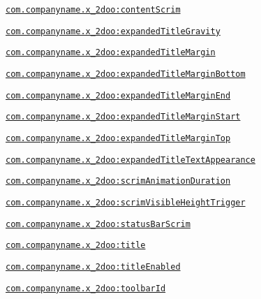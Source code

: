 {\tt \hyperlink{classandroid_1_1support_1_1v4_1_1_r_1_1styleable_060f29f1813e3c34f37be84c9cad4fcd}{com.companyname.x\_\-2doo:contentScrim}}

{\tt \hyperlink{classandroid_1_1support_1_1v4_1_1_r_1_1styleable_93665cc12bb385c8014cbdcaa5d898a6}{com.companyname.x\_\-2doo:expandedTitleGravity}}

{\tt \hyperlink{classandroid_1_1support_1_1v4_1_1_r_1_1styleable_d2288d088bf1c64e433d0cbecf59b50e}{com.companyname.x\_\-2doo:expandedTitleMargin}}

{\tt \hyperlink{classandroid_1_1support_1_1v4_1_1_r_1_1styleable_3c19128c4f13cc0876d4f6a58f4e2d88}{com.companyname.x\_\-2doo:expandedTitleMarginBottom}}

{\tt \hyperlink{classandroid_1_1support_1_1v4_1_1_r_1_1styleable_51a799757acf71b646e197b66d32c630}{com.companyname.x\_\-2doo:expandedTitleMarginEnd}}

{\tt \hyperlink{classandroid_1_1support_1_1v4_1_1_r_1_1styleable_84d535c1e152dbfcb33c3dda89373800}{com.companyname.x\_\-2doo:expandedTitleMarginStart}}

{\tt \hyperlink{classandroid_1_1support_1_1v4_1_1_r_1_1styleable_ed514040b0b3e40f9813597f18ec5fa8}{com.companyname.x\_\-2doo:expandedTitleMarginTop}}

{\tt \hyperlink{classandroid_1_1support_1_1v4_1_1_r_1_1styleable_28094fe9aadbf7fa99afd24d0f68a70e}{com.companyname.x\_\-2doo:expandedTitleTextAppearance}}

{\tt \hyperlink{classandroid_1_1support_1_1v4_1_1_r_1_1styleable_86f1d13a3a764019f8ea6f2166dabaac}{com.companyname.x\_\-2doo:scrimAnimationDuration}}

{\tt \hyperlink{classandroid_1_1support_1_1v4_1_1_r_1_1styleable_ef297f6084b2419ca1056fa3c53bc36f}{com.companyname.x\_\-2doo:scrimVisibleHeightTrigger}}

{\tt \hyperlink{classandroid_1_1support_1_1v4_1_1_r_1_1styleable_6a591832849ef0da0ef6a52fc4f0b623}{com.companyname.x\_\-2doo:statusBarScrim}}

{\tt \hyperlink{classandroid_1_1support_1_1v4_1_1_r_1_1styleable_496e34c231a07ed97f239394f3eda86e}{com.companyname.x\_\-2doo:title}}

{\tt \hyperlink{classandroid_1_1support_1_1v4_1_1_r_1_1styleable_37213d22bd11ccc3f3d3c343c9828a91}{com.companyname.x\_\-2doo:titleEnabled}}

{\tt \hyperlink{classandroid_1_1support_1_1v4_1_1_r_1_1styleable_9f99f544b90e15c7d36234462470e3f7}{com.companyname.x\_\-2doo:toolbarId}}

